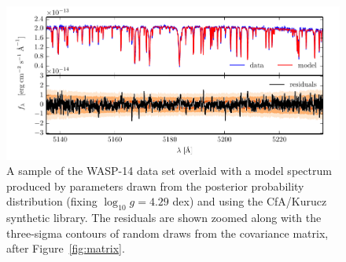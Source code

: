 \documentclass[iop,floatfix]{emulateapj}
\newcommand{\todo}[1]{ \textcolor{blue}{\\TODO: #1}}
\begin{document}
\begin{figure}[!htb]
\begin{center}
\includegraphics{figs/residuals_Kurucz_logg.pdf}
\caption{A sample of the WASP-14 data set overlaid with a model spectrum produced by parameters drawn from the posterior probability distribution (fixing $\log_{10} g = 4.29$ dex) and using the {\sc CfA/Kurucz} synthetic library. The residuals are shown zoomed along with the three-sigma contours of random draws from the covariance matrix, after Figure~\ref{fig:matrix}.}
\label{fig:Kurucz_residuals}
\end{center}
\end{figure}

\end{document}
